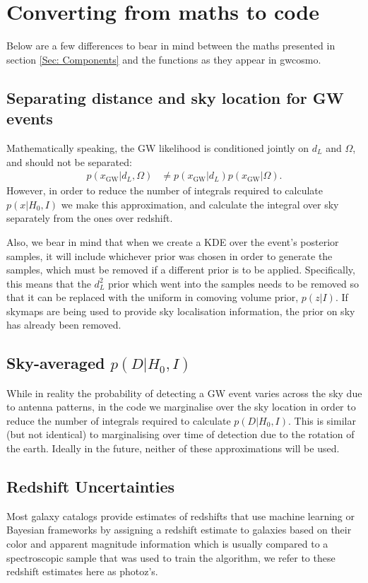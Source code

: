 \documentclass[a4paper,10pt]{article}
\begin{document}
\section{Converting from maths to code \label{Sec: maths2code}}
Below are a few differences to bear in mind between the maths presented in section \ref{Sec: Components} and the functions as they appear in gwcosmo.



\subsection{Separating distance and sky location for GW events}
Mathematically speaking, the GW likelihood is conditioned jointly on $d_L$ and $\Omega$, and should not be separated:
\begin{equation}
\begin{aligned}
p(x_{\text{GW}}|d_L,\Omega) &\neq p(x_{\text{GW}}|d_L) p(x_{\text{GW}}|\Omega).
\end{aligned}
\end{equation}
However, in order to reduce the number of integrals required to calculate $p(x|H_0,I)$ we make this approximation, and calculate the integral over sky separately from the ones over redshift.


Also, we bear in mind that when we create a KDE over the event's posterior samples, it will include whichever prior was chosen in order to generate the samples, which must be removed if a different prior is to be applied.  Specifically, this means that the $d_L^2$ prior which went into the samples needs to be removed so that it can be replaced with the uniform in comoving volume prior, $p(z|I)$.  If skymaps are being used to provide sky localisation information, the prior on sky has already been removed.



\subsection{Sky-averaged $p(D|H_0,I)$}
While in reality the probability of detecting a GW event varies across the sky due to antenna patterns, in the code we marginalise over the sky location in order to reduce the number of integrals required to calculate $p(D|H_0,I)$.  This is similar (but not identical) to marginalising over time of detection due to the rotation of the earth.  Ideally in the future, neither of these approximations will be used.

\subsection{Redshift Uncertainties}
Most galaxy catalogs provide estimates of redshifts that use machine learning or Bayesian frameworks by assigning a redshift estimate to galaxies based on their color and apparent magnitude information which is usually compared to a spectroscopic sample that was used to train the algorithm, we refer to these redshift estimates here as photoz's.
\end{document}
